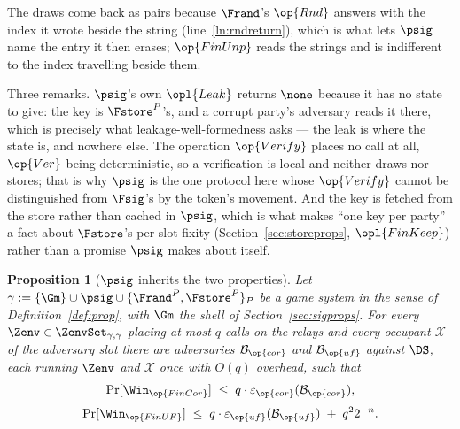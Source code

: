 \documentclass[10pt,oneside,openany]{book}
\theoremstyle{accentdef}
\theoremstyle{accentplain}
\newtheorem{proposition}[definition]{Proposition}
\begin{document}
The draws come back as pairs because $\Frand$'s $\op{Rnd}$ answers with the index it wrote
beside the string (line~\ref{ln:rndreturn}), which is what lets $\psig$ name the entry it then
erases; $\op{FinUnp}$ reads the strings and is indifferent to the index travelling beside them.

Three remarks. $\psig$'s own $\opl{Leak}$ returns $\none$ because it has no state to give: the key
is $\Fstore^{P}$'s, and a corrupt party's adversary reads it there, which is precisely what
leakage-well-formedness asks --- the leak is where the state is, and nowhere else. The operation $\op{Verify}$
places no call at all, $\op{Ver}$ being deterministic, so a verification is local and neither
draws nor stores; that is why $\psig$ is the one protocol here whose $\op{Verify}$ cannot be
distinguished from $\Fsig$'s by the token's movement. And the key is fetched from the store rather
than cached in $\psig$, which is what makes ``one key per party'' a fact about $\Fstore$'s
per-slot fixity (Section~\ref{sec:storeprops}, $\opl{FinKeep}$) rather than a promise $\psig$
makes about itself.

\begin{proposition}[$\psig$ inherits the two properties]\label{prop:psigprops}
Let $\gamma := \{\Gm\} \cup \psig \cup \{\Frand^{P},\Fstore^{P}\}_{P}$ be a game system in the
sense of Definition~\ref{def:prop}, with $\Gm$ the shell of Section~\ref{sec:sigprops}. For every
$\Zenv \in \ZenvSet_{\gamma,\gamma}$ placing at most $q$ calls on the relays and every occupant
$\mathcal{X}$ of the adversary slot there are adversaries $\mathcal{B}_{\op{cor}}$ and
$\mathcal{B}_{\op{uf}}$ against $\DS$, each running $\Zenv$ and $\mathcal{X}$ once with $O(q)$
overhead, such that
\[
  \begin{gathered}
  \Pr[\Win_{\op{FinCor}}] \;\leq\; q \cdot \varepsilon_{\op{cor}}(\mathcal{B}_{\op{cor}}) , \\[3pt]
  \Pr[\Win_{\op{FinUF}}] \;\leq\; q \cdot \varepsilon_{\op{uf}}(\mathcal{B}_{\op{uf}})
  \;+\; q^{2} 2^{-n} .
  \end{gathered}
\]
\end{proposition}
\end{document}
